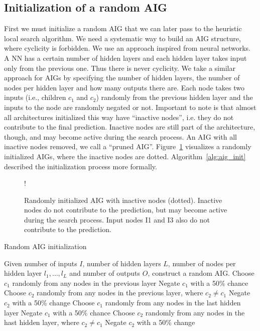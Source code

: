 \subsection{Initialization of a random AIG}
First we must initialize a random AIG that we can later pass to the heuristic local search algorithm. We need a systematic way to build an AIG structure, where cyclicity is forbidden. We use an approach inspired from neural networks. A NN has a certain number of hidden layers and each hidden layer takes input only from the previous one. Thus there is never cyclicity. We take a similar approach for AIGs by specifying the number of hidden layers, the number of nodes per hidden layer and how many outputs there are. Each node takes two inputs (i.e., children $c_1$ and $c_2$) randomly from the previous hidden layer and the inputs to the node are randomly negated or not. Important to note is that almost all architectures initialized this way have \enquote{inactive nodes}, i.e. they do not contribute to the final prediction. Inactive nodes are still part of the architecture, though, and may become active during the search process. An AIG with all inactive nodes removed, we call a \enquote{pruned AIG}. Figure~\ref{fig:aig-init} visualizes a randomly initialized AIGs, where the inactive nodes are dotted. Algorithm~\ref{alg:aig_init} described the initialization process more formally. 

\begin{figure}[!htb]
    \centering
    \resizebox {0.45\textwidth} {!} {
      
    }
    \caption{Randomly initialized AIG with inactive nodes (dotted). Inactive nodes do not contribute to the prediction, but may become active during the search process. Input nodes I1 and I3 also do not contribute to the prediction.}
\label{fig:aig-init}
\end{figure}
\FloatBarrier

\begin{algorithm}
  \caption{Random AIG initialization}
  \label{alg:aig_init}
  \begin{algorithmic}
    \State Given number of inputs $I$, number of hidden layers $L$, number of nodes per hidden layer $l_1, \dots, l_L$ and number of outputs $O$, construct a random AIG.
    \vspace{1em}
        \State Choose $c_1$ randomly from any nodes in the previous layer
        \State Negate $c_1$ with a 50\% chance
        \State Choose $c_2$ randomly from any nodes in the previous layer,  where $c_2 \neq c_1$
        \State Negate $c_2$ with a 50\% change
      \EndFor
    \EndFor
      \State Choose $c_1$ randomly from any nodes in the last hidden layer
      \State Negate $c_1$ with a 50\% chance
      \State Choose $c_2$ randomly from any nodes in the hast hidden layer,  where $c_2 \neq c_1$
      \State Negate $c_2$ with a 50\% change
    \EndFor
  \end{algorithmic}
\end{algorithm}
\FloatBarrier

